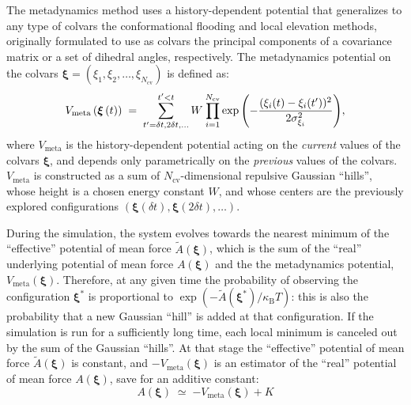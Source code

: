 
The metadynamics method uses a history-dependent potential \cite{Laio2002} that generalizes to any type of colvars the conformational flooding \cite{Grubmuller1995} and local elevation \cite{Huber1994} methods,  originally formulated to use as colvars the principal components of a covariance matrix or a set of dihedral  angles, respectively.
The metadynamics potential on the colvars $\bm{\xi} = (\xi_{1}, \xi_{2}, \ldots, \xi_{N_{\mathrm{cv}}})$ is defined as:
\begin{equation}
  \label{eq:colvars_meta_pot}
  V_{\mathrm{meta}}\left({\mbox{\boldmath{$\xi$}}}\left(t\right)\right) \; = \; {
    \sum_{t' = \delta{}t, \\ 2\delta{}t, \\ \ldots}^{t'<t} W \: {
      \prod_{i = 1}^{N_{\mathrm{cv}}}
      \exp\left(-\frac{(\xi_{i}(t)-\xi_{i}(t'))^{2}}{2\sigma_{\xi_{i}}^{2}}\right)
    }
  }\mathrm{,}
\end{equation}
where $V_{\mathrm{meta}}$ is the history-dependent potential acting on the \emph{current} values of the colvars $\bm{\xi}$, and depends only parametrically on the \emph{previous} values of the colvars.
$V_{\mathrm{meta}}$ is constructed as a sum of $N_{\mathrm{cv}}$-dimensional repulsive Gaussian ``hills'', whose height is a chosen energy constant $W$, and whose centers are the previously explored configurations $\left(\bm{\xi}(\delta{}t), \bm{\xi}(2\delta{}t), \ldots\right)$.

During the simulation, the system evolves towards the nearest minimum of the ``effective'' potential of mean force $\tilde{A}(\bm{\xi})$, which is the sum of the ``real'' underlying potential of mean force $A(\bm{\xi})$  and the the metadynamics potential, $V_{\mathrm{meta}}(\bm{\xi})$.
Therefore, at any given time the probability of observing the configuration $\bm{\xi^{*}}$ is proportional to $\exp\left(-\tilde{A}(\bm{\xi^{*}})/\kappa_{\mathrm{B}}T\right)$: this is also the probability that a new Gaussian ``hill'' is added at that configuration.
If the simulation is run for a sufficiently long time, each local minimum is canceled out by the sum of the Gaussian ``hills''.
At that stage the ``effective'' potential of mean force $\tilde{A}(\bm{\xi})$ is constant, and $-V_{\mathrm{meta}}(\bm{\xi})$ is an estimator of the ``real'' potential of mean force $A(\bm{\xi})$,  save for an additive constant:
\begin{equation}
  \label{eq:colvars_meta_fes}
  A(\bm{\xi}) \; \simeq \; {
    -V_{\mathrm{meta}}(\bm{\xi}) + K
  }
\end{equation}

